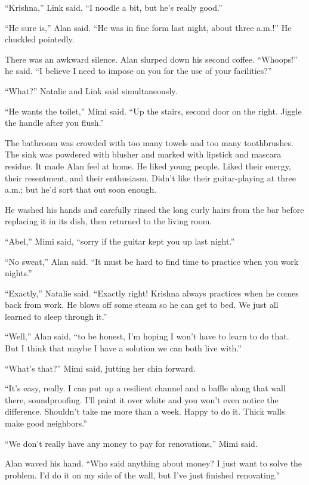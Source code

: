 ``Krishna,'' Link said.  ``I noodle a bit, but he's really good.''

``He sure is,'' Alan said.  ``He was in fine form last night, about
three a.m.!'' He chuckled pointedly.

There was an awkward silence.  Alan slurped down his second coffee. 
``Whoops!'' he said.  ``I believe I need to impose on you for the use
of your facilities?''

``What?'' Natalie and Link said simultaneously.

``He wants the toilet,'' Mimi said.  ``Up the stairs, second door on
the right.  Jiggle the handle after you flush.''

The bathroom was crowded with too many towels and too many
toothbrushes.  The sink was powdered with blusher and marked with
lipstick and mascara residue.  It made Alan feel at home.  He liked
young people.  Liked their energy, their resentment, and their
enthusiasm.  Didn't like their guitar-playing at three a.m.; but he'd
sort that out soon enough.

He washed his hands and carefully rinsed the long curly hairs from the
bar before replacing it in its dish, then returned to the living room.

``Abel,'' Mimi said, ``sorry if the guitar kept you up last night.''

``No sweat,'' Alan said.  ``It must be hard to find time to practice
when you work nights.''

``Exactly,'' Natalie said.  ``Exactly right!  Krishna always practices
when he comes back from work.  He blows off some steam so he can get
to bed.  We just all learned to sleep through it.''

``Well,'' Alan said, ``to be honest, I'm hoping I won't have to learn
to do that.  But I think that maybe I have a solution we can both live
with.''

``What's that?'' Mimi said, jutting her chin forward.

``It's easy, really.  I can put up a resilient channel and a baffle
along that wall there, soundproofing.  I'll paint it over white and
you won't even notice the difference.  Shouldn't take me more than a
week.  Happy to do it.  Thick walls make good neighbors.''

``We don't really have any money to pay for renovations,'' Mimi said.

Alan waved his hand.  ``Who said anything about money?  I just want to
solve the problem.  I'd do it on my side of the wall, but I've just
finished renovating.''


